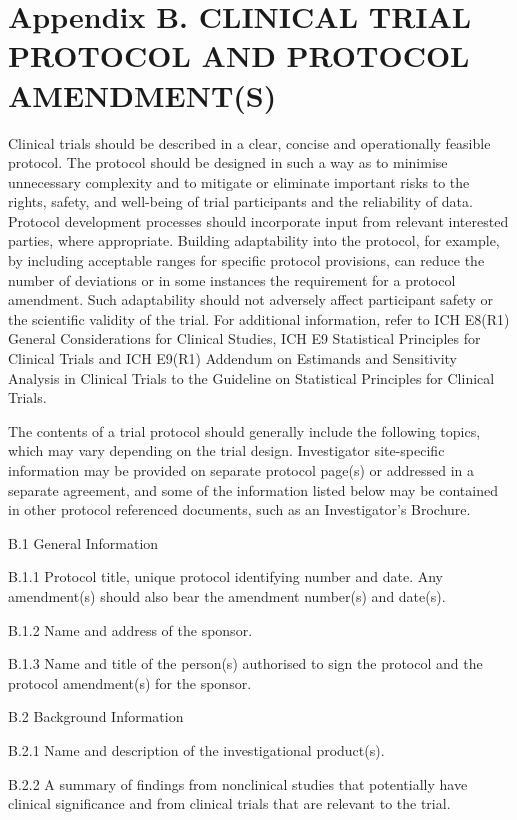 \documentclass[11pt]{article}
\begin{document}
\section{Appendix B. CLINICAL TRIAL PROTOCOL AND PROTOCOL AMENDMENT(S)}

Clinical trials should be described in a clear, concise and operationally feasible protocol. The protocol should be designed in such a way as to minimise unnecessary complexity and to mitigate or eliminate important risks to the rights, safety, and well-being of trial participants and the reliability of data. Protocol development processes should incorporate input from relevant interested parties, where appropriate. Building adaptability into the protocol, for example, by including acceptable ranges for specific protocol provisions, can reduce the number of deviations or in some instances the requirement for a protocol amendment. Such adaptability should not adversely affect participant safety or the scientific validity of the trial. For additional information, refer to ICH E8(R1) General Considerations for Clinical Studies, ICH E9 Statistical Principles for Clinical Trials and ICH E9(R1) Addendum on Estimands and Sensitivity Analysis in Clinical Trials to the Guideline on Statistical Principles for Clinical Trials.


The contents of a trial protocol should generally include the following topics, which may vary depending on the trial design. Investigator site-specific information may be provided on separate protocol page(s) or addressed in a separate agreement, and some of the information listed below may be contained in other protocol referenced documents, such as an Investigator's Brochure.


B.1 General Information


B.1.1 Protocol title, unique protocol identifying number and date. Any amendment(s) should also bear the amendment number(s) and date(s).


B.1.2 Name and address of the sponsor.


B.1.3 Name and title of the person(s) authorised to sign the protocol and the protocol amendment(s) for the sponsor.


B.2 Background Information


B.2.1 Name and description of the investigational product(s).


B.2.2 A summary of findings from nonclinical studies that potentially have clinical significance and from clinical trials that are relevant to the trial.
\end{document}
